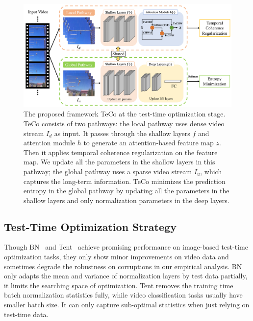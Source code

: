 \documentclass{article} %
\begin{document}
\begin{figure}[t]
\begin{center}
        \includegraphics[width=0.85\linewidth]{./images/framework.pdf}
\end{center}
\caption{The proposed framework TeCo at the test-time optimization stage. TeCo consists of two pathways: the local pathway uses dense video stream $I_{d}$ as input. It passes through the shallow layers $f$ and attention module $h$ to generate an attention-based feature map $z$. Then it applies temporal coherence regularization on the feature map. We update all the parameters in the shallow layers in this pathway; the global pathway uses a sparse video stream $I_{u}$, which captures the long-term information. TeCo minimizes the prediction entropy in the global pathway by updating all the parameters in the shallow layers and only normalization parameters in the deep layers.
% 
}
\label{framework-fig}
\vspace{-0.5cm}
\end{figure}

\subsection{Test-Time Optimization Strategy}
Though BN~\citep{schneider2020improving} and Tent~\citep{wang2020tent} achieve promising performance on image-based test-time optimization tasks, they only show minor improvements on video data and sometimes degrade the robustness on corruptions in our empirical analysis.
BN only adapts the mean and variance of normalization layers by test data partially, 
it limits the searching space of optimization. 
Tent removes the training time batch normalization statistics fully, while video classification tasks usually have smaller batch size. 
It can only capture sub-optimal statistics when just relying on test-time data.
\end{document}
